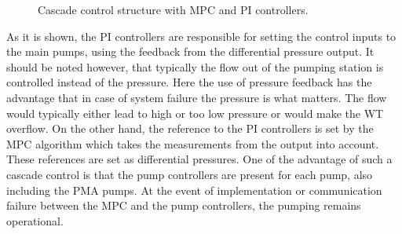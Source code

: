 
\begin{figure}[H]
\centering
 
\caption{Cascade control structure with MPC and PI controllers.}
\label{fig:control_structure}
\end{figure}

As it is shown, the PI controllers are responsible for setting the control inputs to the main pumps, using the feedback from the differential pressure output. It should be noted however, that typically the flow out of the pumping station is controlled instead of the pressure. Here the use of pressure feedback has the advantage that in case of system failure the pressure is what matters. The flow would typically either lead to high or too low pressure or would make the WT overflow. On the other hand, the reference to the PI controllers is set by the MPC algorithm which takes the measurements from the output into account. These references are set as differential pressures. One of the advantage of such a cascade control is that the pump controllers are present for each pump, also including the PMA pumps. At the event of implementation or communication failure between the MPC and the pump controllers, the pumping remains operational. 
 



